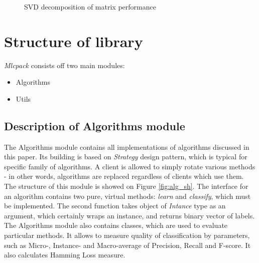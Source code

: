 \begin{figure}
\centering
\label{fig:svd_perf}
\caption{SVD decomposition of matrix performance}
\end{figure}


\section{Structure of library}

\textit{Mlcpack} consists off two main modules:
\begin{itemize}
\item Algorithms
\item Utils
\end{itemize}

\subsection{Description of Algorithms module}

The Algorithms module contains all implementations of algorithms discussed in this paper. Its building is based on \textit{Strategy} design pattern, which is typical for specific family of algorithms. A client is allowed to simply rotate various methods - in other words, algorithms are replaced regardless of clients which use them. The structure of this module is showed on Figure \ref{fig:alg_sh}. 
The interface for an algorithm contains two pure, virtual methods: \textit{learn} and \textit{classify}, which must be implemented. The second function takes object of \textit{Intance} type as an argument, which certainly wraps an instance, and returns binary vector of labels. The Algorithms module also contains classes, which are used to evaluate particular methods. It allows to measure quality of classification by parameters, such as Micro-, Instance- and Macro-average of Precision, Recall and F-score. It also calculates Hamming Loss measure. 

